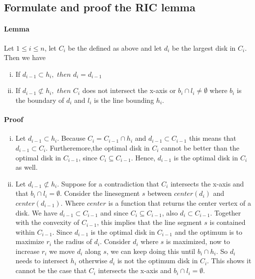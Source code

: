 \documentclass{article}
\begin{document}
\subsection{Formulate and proof the RIC lemma}
\paragraph{Lemma}
Let $1 \leq i \leq n$, let $C_i$ be the defined as above and let $d_i$ be
the largest disk in $C_i$. Then we have
\begin{enumerate}[(i)]
	\item If $d_{i-1} \subset h_i,$ $then$ $d_i = d_{i-1}$
	\item If $d_{i-1} \not\subset h_{i},$ $then$ $C_i$ does not intersect the x-axis
		or $b_i \cap l_i \neq \emptyset$ where $b_i$ is the boundary of $d_i$ and $l_i$
		is the line bounding $h_i$.
\end{enumerate}
\paragraph{Proof}
\newpage
\begin{enumerate}[(i)]
	\item Let $d_{i-1} \subset h_i$. Because $C_i = C_{i-1}\cap h_i$ and
		$d_{i-1} \subset C_{i-1}$ this means that $d_{i-1} \subset C_i$.
		Furtheremore,the optimal disk in $C_i$
		cannot be better than the optimal disk in $C_{i-1}$, since
		$C_i \subseteq C_{i-1}$. Hence, $d_{i-1}$ is the optimal disk
		in $C_i$ as well.
	\item Let $d_{i-1} \not\subset h_{i}$. Suppose for a contradiction that
		$C_i$ intersects the x-axis and that $b_i \cap l_i = \emptyset$.
		Consider the linesegment $s$ between $center(d_i)$ and 
		$center(d_{i-1})$.
		Where $center$ is a function that returns the center vertex of a disk.
		We have $d_{i-1} \subset C_{i-1}$ and
		since $C_i \subseteq C_{i-1}$, also $d_i \subset C_{i-1}$.
		Together with the convexity of $C_{i-1}$, this implies that
		the line segment $s$ is contained within $C_{i-1}$.
		Since $d_{i-1}$ is the optimal disk in $C_{i-1}$ and the optimum is to
		maximize $r_i$ the radius of $d_i$. Consider $d_i$
		where $s$ is maximized, now to increase $r_i$ we move $d_i$ along $s$,
		we can keep doing this until $b_i \cap h_i$.
		So $d_i$ needs to intersect $h_i$ otherwise $d_i$ is not the optimum
		disk in $C_i$. This shows it cannot be the case that $C_i$ intersects
		the x-axis and $b_i\cap l_i = \emptyset$.

\end{enumerate}
\end{document}
